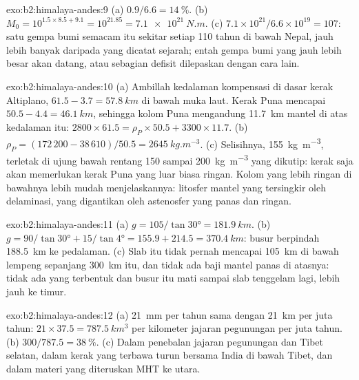 \begin{solution}{exo:b2:himalaya-andes:9}
(a) $0.9/6.6 = \qty{14}{\percent}$. (b) $M_0 = 10^{1.5\times8.5 + 9.1} = 10^{21.85} =
\qty{7.1e21}{N.m}$. (c) $7.1\times10^{21}/6.6\times10^{19} = 107$: satu gempa bumi semacam itu sekitar
setiap 110 tahun di bawah Nepal, jauh lebih banyak daripada yang dicatat sejarah; entah gempa bumi yang jauh lebih besar
akan datang, atau sebagian defisit dilepaskan dengan cara lain.
\end{solution}

\begin{solution}{exo:b2:himalaya-andes:10}
(a) Ambillah kedalaman kompensasi di dasar kerak Altiplano, $61.5 - 3.7 =
\qty{57.8}{km}$ di bawah muka laut. Kerak Puna mencapai $50.5 - 4.4 = \qty{46.1}{km}$, sehingga
kolom Puna mengandung \qty{11.7}{km} mantel di atas kedalaman itu: $2800\times61.5 =
\rho_P\times50.5 + 3300\times11.7$. (b) $\rho_P = (172\,200 - 38\,610)/50.5 =
\qty{2645}{kg.m^{-3}}$. (c) Selisihnya, \qty{155}{kg.m^{-3}}, terletak di ujung bawah
rentang 150 sampai \qty{200}{kg.m^{-3}} yang dikutip: kerak saja akan memerlukan kerak Puna yang luar biasa ringan.
Kolom yang lebih ringan di bawahnya lebih mudah menjelaskannya: litosfer mantel yang tersingkir oleh delaminasi,
yang digantikan oleh astenosfer yang panas dan ringan.
\end{solution}

\begin{solution}{exo:b2:himalaya-andes:11}
(a) $g = 105/\tan\ang{30} = \qty{181.9}{km}$. (b) $g = 90/\tan\ang{30} + 15/\tan\ang{4} =
155.9 + 214.5 = \qty{370.4}{km}$: busur berpindah \qty{188.5}{km} ke pedalaman. (c) Slab itu tidak pernah
mencapai \qty{105}{km} di bawah lempeng sepanjang \qty{300}{km} itu, dan tidak ada baji mantel panas
di atasnya: tidak ada  yang terbentuk dan busur itu mati sampai slab tenggelam lagi, lebih jauh ke timur.
\end{solution}

\begin{solution}{exo:b2:himalaya-andes:12}
(a) \qty{21}{mm} per tahun sama dengan \qty{21}{km} per juta tahun: $21\times37.5 =
\qty{787.5}{km^3}$ per kilometer jajaran pegunungan per juta tahun. (b) $300/787.5 =
\qty{38}{\percent}$. (c) Dalam penebalan jajaran pegunungan dan Tibet selatan, dalam kerak yang
terbawa turun bersama India di bawah Tibet, dan dalam materi yang diteruskan MHT ke utara.
\end{solution}

